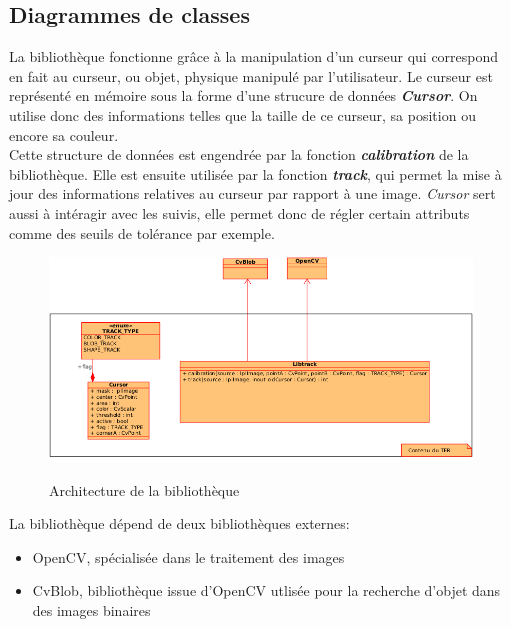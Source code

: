 \documentclass{report}
\begin{document}
			\subsection{Diagrammes de classes}
				La bibliothèque fonctionne grâce à la manipulation d'un curseur qui correspond en fait au curseur, ou objet, physique manipulé par l'utilisateur.
				Le curseur est représenté en mémoire sous la forme d'une strucure de données \textbf{\textit{Cursor}}. On utilise donc des informations telles que la taille de ce curseur, sa position ou encore sa couleur.\\
				Cette structure de données est engendrée par la fonction \textit{\textbf{calibration}} de la bibliothèque. Elle est ensuite utilisée par la fonction \textit{\textbf{track}}, qui permet la mise à jour des informations relatives au curseur par rapport à une image. \textit{Cursor} sert aussi à intéragir avec les suivis, elle permet donc de régler certain attributs comme des seuils de tolérance par exemple. \\
				\begin{figure}[!h]
						\centering
						\includegraphics[scale=0.8]{../images/libtrack-uml.png}\\
						\caption{Architecture de la bibliothèque}
						\label{Architecture de la bibliothèque}
				\end{figure}
				

				La bibliothèque dépend de deux bibliothèques externes:
				\begin{itemize}
					\item OpenCV, spécialisée dans le traitement des images
					\item CvBlob, bibliothèque issue d'OpenCV utlisée pour la recherche d'objet dans des images binaires
				\end{itemize}
\end{document}
